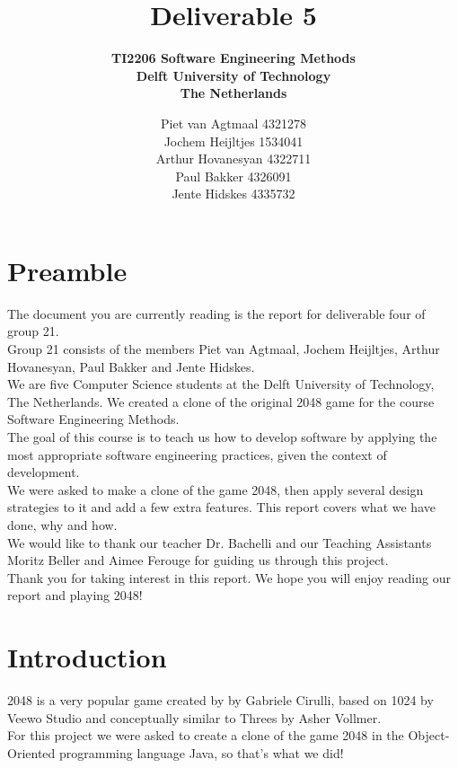 \documentclass[a4paper,11pt,report]{scrartcl}
\title{\huge\textbf{Deliverable 5}}
\subtitle{\textbf{TI2206 Software Engineering Methods\\
Delft University of Technology\\
The Netherlands}}
\author{Piet van Agtmaal 4321278\\
	    Jochem Heijltjes 1534041\\
		Arthur Hovanesyan 4322711\\
		Paul Bakker 4326091\\
		Jente Hidskes 4335732
	   }
\begin{document}
\begin{titlepage}
\maketitle
\thispagestyle{empty} %
\end{titlepage}

\newpage\section{Preamble}

The document you are currently reading is the report for deliverable four of group 21.\\

Group 21 consists of the members 
Piet van Agtmaal, Jochem Heijltjes, Arthur Hovanesyan, Paul Bakker and Jente Hidskes.\\
We are five Computer Science students at the Delft University of Technology,
The Netherlands. We created a clone of the original 2048 game for the course
Software Engineering Methods.\\

The goal of this course is to teach us how to develop software by applying the most appropriate software engineering practices, given the context of development.\\
We were asked to make a clone of the game 2048, then apply several design strategies to it and add a few extra features. This report covers what we have done, why and how.\\

We would like to thank our teacher Dr. Bachelli and our Teaching Assistants Moritz Beller and Aimee Ferouge for guiding us through this project.\\

Thank you for taking interest in this report. We hope you will enjoy reading our report and playing 2048!

\newpage\section{Introduction}

2048 is a very popular game created by by Gabriele Cirulli, based on 1024 by
Veewo Studio and conceptually similar to Threes by Asher Vollmer.\\
For this project we were asked to create a clone of the game 2048 in the Object-Oriented programming language Java, so that's what we did!\\
\end{document}
